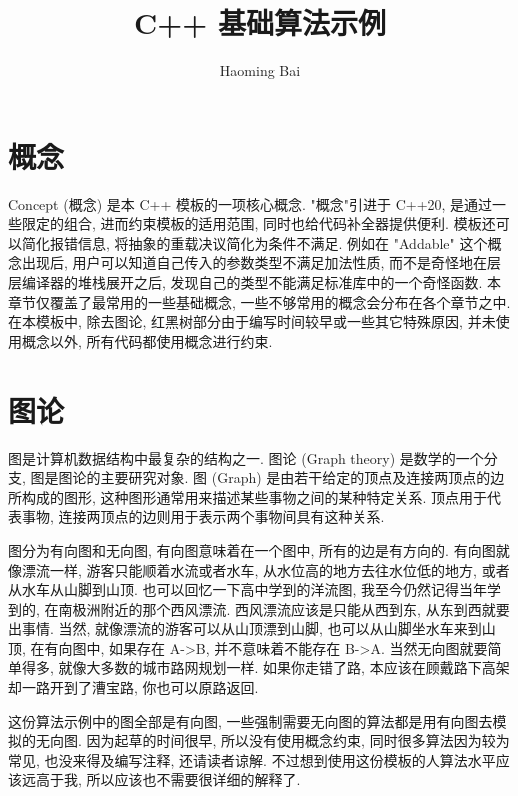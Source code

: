 \documentclass[a4paper]{ctexart}
\title{C++ 基础算法示例}
\author{Haoming Bai}
\begin{document}
\maketitle
\tableofcontents

\section{概念}

Concept (概念) 是本 C++ 模板的一项核心概念. "概念"引进于 C++20, 是通过一些限定的组合, 进而约束模板的适用范围, 同时也给代码补全器提供便利. 模板还可以简化报错信息, 将抽象的重载决议简化为条件不满足. 例如在 "Addable" 这个概念出现后, 用户可以知道自己传入的参数类型不满足加法性质, 而不是奇怪地在层层编译器的堆栈展开之后, 发现自己的类型不能满足标准库中的一个奇怪函数. 本章节仅覆盖了最常用的一些基础概念, 一些不够常用的概念会分布在各个章节之中. 在本模板中, 除去图论, 红黑树部分由于编写时间较早或一些其它特殊原因, 并未使用概念以外, 所有代码都使用概念进行约束.



\section{图论}

图是计算机数据结构中最复杂的结构之一. 图论 (Graph theory) 是数学的一个分支, 图是图论的主要研究对象. 图 (Graph) 是由若干给定的顶点及连接两顶点的边所构成的图形, 这种图形通常用来描述某些事物之间的某种特定关系. 顶点用于代表事物, 连接两顶点的边则用于表示两个事物间具有这种关系.

图分为有向图和无向图, 有向图意味着在一个图中, 所有的边是有方向的. 有向图就像漂流一样, 游客只能顺着水流或者水车, 从水位高的地方去往水位低的地方, 或者从水车从山脚到山顶. 也可以回忆一下高中学到的洋流图, 我至今仍然记得当年学到的, 在南极洲附近的那个西风漂流. 西风漂流应该是只能从西到东, 从东到西就要出事情. 当然, 就像漂流的游客可以从山顶漂到山脚, 也可以从山脚坐水车来到山顶, 在有向图中, 如果存在 A->B, 并不意味着不能存在 B->A. 当然无向图就要简单得多, 就像大多数的城市路网规划一样. 如果你走错了路, 本应该在顾戴路下高架却一路开到了漕宝路, 你也可以原路返回.

这份算法示例中的图全部是有向图, 一些强制需要无向图的算法都是用有向图去模拟的无向图. 因为起草的时间很早, 所以没有使用概念约束, 同时很多算法因为较为常见, 也没来得及编写注释, 还请读者谅解. 不过想到使用这份模板的人算法水平应该远高于我, 所以应该也不需要很详细的解释了.


\end{document}
